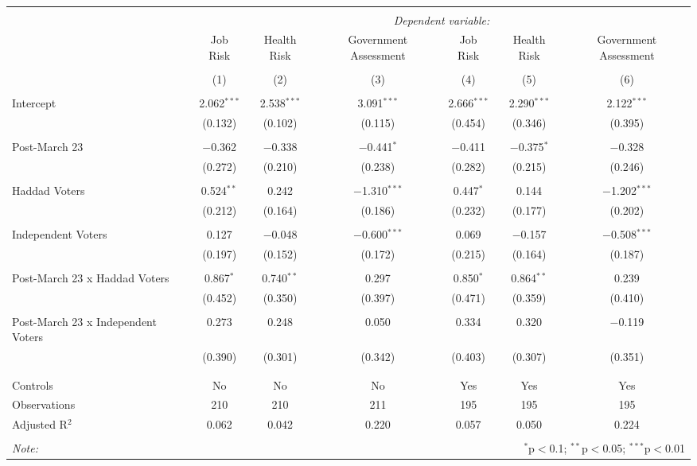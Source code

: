 
\begin{table}[!htbp] \centering 
  \caption{} 
  \label{} 
\begin{tabular}{@{\extracolsep{5pt}}lcccccc} 
\\[-1.8ex]\hline 
\hline \\[-1.8ex] 
 & \multicolumn{6}{c}{\textit{Dependent variable:}} \\ 
\cline{2-7} 
 & Job Risk & Health Risk & Government Assessment & Job Risk & Health Risk & Government Assessment \\ 
\\[-1.8ex] & (1) & (2) & (3) & (4) & (5) & (6)\\ 
\hline \\[-1.8ex] 
 Intercept & 2.062$^{***}$ & 2.538$^{***}$ & 3.091$^{***}$ & 2.666$^{***}$ & 2.290$^{***}$ & 2.122$^{***}$ \\ 
  & (0.132) & (0.102) & (0.115) & (0.454) & (0.346) & (0.395) \\ 
  & & & & & & \\ 
 Post-March 23 & $-$0.362 & $-$0.338 & $-$0.441$^{*}$ & $-$0.411 & $-$0.375$^{*}$ & $-$0.328 \\ 
  & (0.272) & (0.210) & (0.238) & (0.282) & (0.215) & (0.246) \\ 
  & & & & & & \\ 
 Haddad Voters & 0.524$^{**}$ & 0.242 & $-$1.310$^{***}$ & 0.447$^{*}$ & 0.144 & $-$1.202$^{***}$ \\ 
  & (0.212) & (0.164) & (0.186) & (0.232) & (0.177) & (0.202) \\ 
  & & & & & & \\ 
 Independent Voters & 0.127 & $-$0.048 & $-$0.600$^{***}$ & 0.069 & $-$0.157 & $-$0.508$^{***}$ \\ 
  & (0.197) & (0.152) & (0.172) & (0.215) & (0.164) & (0.187) \\ 
  & & & & & & \\ 
 Post-March 23 x Haddad Voters & 0.867$^{*}$ & 0.740$^{**}$ & 0.297 & 0.850$^{*}$ & 0.864$^{**}$ & 0.239 \\ 
  & (0.452) & (0.350) & (0.397) & (0.471) & (0.359) & (0.410) \\ 
  & & & & & & \\ 
 Post-March 23 x Independent Voters & 0.273 & 0.248 & 0.050 & 0.334 & 0.320 & $-$0.119 \\ 
  & (0.390) & (0.301) & (0.342) & (0.403) & (0.307) & (0.351) \\ 
  & & & & & & \\ 
\hline \\[-1.8ex] 
Controls & No & No & No & Yes & Yes & Yes \\ 
Observations & 210 & 210 & 211 & 195 & 195 & 195 \\ 
Adjusted R$^{2}$ & 0.062 & 0.042 & 0.220 & 0.057 & 0.050 & 0.224 \\ 
\hline 
\hline \\[-1.8ex] 
\textit{Note:}  & \multicolumn{6}{r}{$^{*}$p$<$0.1; $^{**}$p$<$0.05; $^{***}$p$<$0.01} \\ 
\end{tabular} 
\end{table} 
